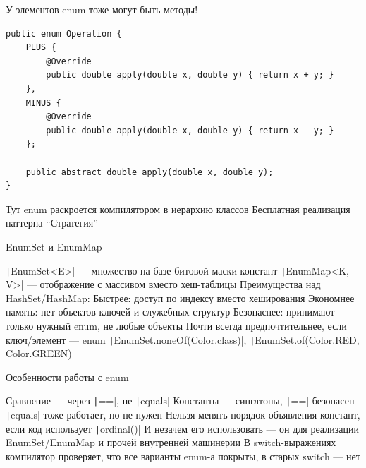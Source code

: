 \documentclass{../../slides-style}
\begin{document}
    \begin{frame}[fragile]{У элементов enum тоже могут быть методы!}
        \begin{small}
            \begin{verbatim}
public enum Operation {
    PLUS {
        @Override
        public double apply(double x, double y) { return x + y; }
    },
    MINUS {
        @Override
        public double apply(double x, double y) { return x - y; }
    };

    public abstract double apply(double x, double y);
}
            \end{verbatim}
        \end{small}
        \begin{outline}
            \1 Тут enum раскроется компилятором в иерархию классов
            \1 Бесплатная реализация паттерна \enquote{Стратегия}
        \end{outline}
    \end{frame}

    \begin{frame}{EnumSet и EnumMap}
        \begin{outline}
            \1 \texttt|EnumSet<E>| --- множество на базе битовой маски констант
            \1 \texttt|EnumMap<K, V>| --- отображение с массивом вместо хеш-таблицы
            \1 Преимущества над HashSet/HashMap:
                \2 Быстрее: доступ по индексу вместо хеширования
                \2 Экономнее память: нет объектов-ключей и служебных структур
            \1 Безопаснее: принимают только нужный enum, не любые объекты
            \1 Почти всегда предпочтительнее, если ключ/элемент --- enum
            \1 \texttt|EnumSet.noneOf(Color.class)|, \texttt|EnumSet.of(Color.RED, Color.GREEN)|
        \end{outline}
    \end{frame}

    \begin{frame}{Особенности работы с enum}
        \begin{outline}
            \1 Сравнение --- через \texttt|==|, не \texttt|equals|
                \2 Константы --- синглтоны, \texttt|==| безопасен
                \2 \texttt|equals| тоже работает, но не нужен
            \1 Нельзя менять порядок объявления констант, если код использует \texttt|ordinal()|
                \2 И незачем его использовать --- он для реализации EnumSet/EnumMap и прочей внутренней машинерии
            \1 В switch-выражениях компилятор проверяет, что все варианты enum-а покрыты, в старых switch --- нет
        \end{outline}
    \end{frame}
\end{document}

